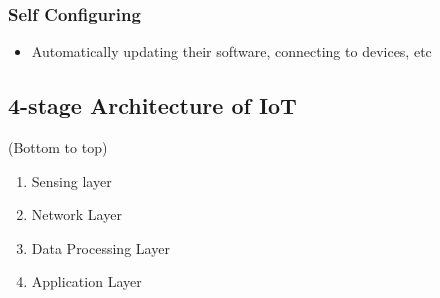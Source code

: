 \documentclass[11pt]{article}
\begin{document}
\subsubsection{Self Configuring}
\label{sec:orgfcd65f3}
\begin{itemize}
\item Automatically updating their software, connecting to devices, etc
\end{itemize}

\subsection{4-stage Architecture of IoT}
\label{sec:org321bad9}
(Bottom to top)
\begin{enumerate}
\item Sensing layer
\item Network Layer
\item Data Processing Layer
\item Application Layer
\end{enumerate}
\end{document}
